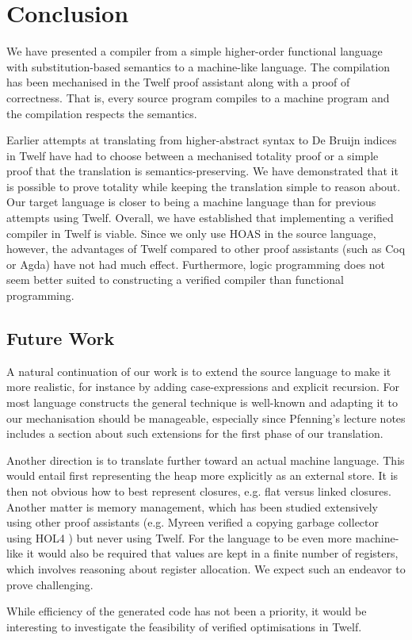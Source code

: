 \clearpage

\section{Conclusion}

We have presented a compiler from a simple higher-order functional language with substitution-based semantics to a machine-like language.
The compilation has been mechanised in the Twelf proof assistant along with a proof of correctness.
That is, every source program compiles to a machine program and the compilation respects the semantics.

Earlier attempts at translating from higher-abstract syntax to De Bruijn indices in Twelf have had to choose between a mechanised totality proof or a simple proof that the translation is semantics-preserving.
We have demonstrated that it is possible to prove totality while keeping the translation simple to reason about.
Our target language is closer to being a machine language than for previous attempts using Twelf.
Overall, we have established that implementing a verified compiler in Twelf is viable.
Since we only use HOAS in the source language, however, the advantages of Twelf compared to other proof assistants (such as Coq or Agda) have not had much effect.
Furthermore, logic programming does not seem better suited to constructing a verified compiler than functional programming.


\subsection{Future Work}

A natural continuation of our work is to extend the source language to make it more realistic, for instance by adding case-expressions and explicit recursion.
For most language constructs the general technique is well-known and adapting it to our mechanisation should be manageable, especially since Pfenning's lecture notes includes a section \cite[ch. 6.2]{Pfenning01} about such extensions for the first phase of our translation.

Another direction is to translate further toward an actual machine language.
This would entail first representing the heap more explicitly as an external store.
It is then not obvious how to best represent closures, e.g. flat versus linked closures.
Another matter is memory management, which has been studied extensively using other proof assistants (e.g. Myreen verified a copying garbage collector using HOL4 \cite{Myreen10}) but never using Twelf.
For the language to be even more machine-like it would also be required that values are kept in a finite number of registers, which involves reasoning about register allocation.
We expect such an endeavor to prove challenging.

While efficiency of the generated code has not been a priority, it would be interesting to investigate the feasibility of verified optimisations in Twelf.
